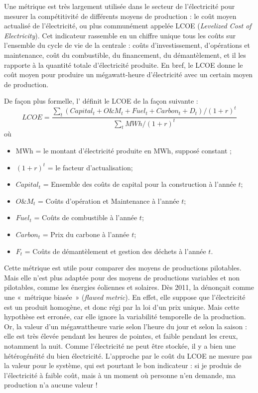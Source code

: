 Une métrique est très largement utilisée dans le secteur de l’électricité pour mesurer la compétitivité de différents moyens de production : le coût moyen actualisé de l’électricité, ou plus communément appelée LCOE (\textit{Levelized Cost of Electricity}).
Cet indicateur rassemble en un chiffre unique tous les coûts sur l’ensemble du cycle de vie de la centrale : coûts d’investissement, d’opérations et maintenance, coût du combustible, du financement, du démantèlement, et il les rapporte à la quantité totale d’électricité produite. En bref, le LCOE donne le coût moyen pour produire un mégawatt-heure d’électricité avec un certain moyen de production.

De façon plus formelle, l’\citet{InternationalEnergyAgency2015} définit le LCOE de la façon suivante :
$$LCOE = \frac{\sum_t (Capital_t + O\&M_t + Fuel_t + Carbon_t + D_t) / (1+r)^t}{\sum_t MWh / (1+r)^t}$$
où
\begin{itemize}
	\item MWh = le montant d'électricité produite en MWh, supposé constant ;
	\item $(1+r)^t$ = le facteur d'actualisation;
	\item $Capital_t$ = Ensemble des coûts de capital pour la construction à l'année $t$;
	\item $O\&M_t$ = Coûts d'opération et Maintenance à l'année $t$;
	\item $Fuel_t$  = Coûts de combustible à l'année $t$;
	\item $Carbon_t$ = Prix du carbone à l'année $t$;
	\item $F_t$ = Coûts de démantèlement et gestion des déchets à l'année $t$.
\end{itemize}

Cette métrique est utile pour comparer des moyens de productions pilotables. Mais elle n’est plus adaptée pour des moyens de productions variables et non pilotables, comme les énergies éoliennes et solaires. Dès 2011, \citet{Joskow2011a} la dénonçait comme une  «~métrique biasée~» (\textit{flawed metric}). En effet, elle suppose que l’électricité est un produit homogène, et donc régi par la loi d’un prix unique. Mais cette hypothèse est erronée, car elle ignore la variabilité temporelle de la production. Or, la valeur d’un mégawattheure varie selon l’heure du jour et selon la saison : elle est très élevée pendant les heures de pointes, et faible pendant les creux, notamment la nuit. Comme l’électricité ne peut être stockée, il y a bien une hétérogénéité du bien électricité. L’approche par le coût du LCOE ne mesure pas la valeur pour le système, qui est pourtant le bon indicateur : si je produis de l’électricité à faible coût, mais à un moment où personne n’en demande, ma production n’a aucune valeur !

